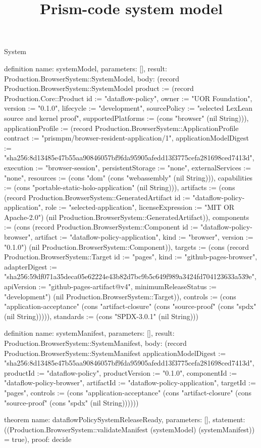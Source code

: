 \begin{lexlean}{System}
\title{Prism-code system model}
\begin{semanticmodule}
definition{
  name: systemModel,
  parameters: [],
  result: Production.BrowserSystem::SystemModel,
  body: (record Production.BrowserSystem::SystemModel {product := (record Production.Core::Product {id := "dataflow-policy", owner := "UOR Foundation", version := "0.1.0", lifecycle := "development", sourcePolicy := "selected LexLean source and kernel proof", supportedPlatforms := (cons "browser" (nil String))}), applicationProfile := (record Production.BrowserSystem::ApplicationProfile {contract := "prismpm/browser-resident-application/1", applicationModelDigest := "sha256:8d13485e47b55aa90846057bf9fda95905afedd13f3775cefa281698ced7413d", execution := "browser-session", persistentStorage := "none", externalServices := "none", resources := (cons "dom" (cons "webassembly" (nil String))), capabilities := (cons "portable-static-holo-application" (nil String))}), artifacts := (cons (record Production.BrowserSystem::GeneratedArtifact {id := "dataflow-policy-application", role := "selected-application", licenseExpression := "MIT OR Apache-2.0"}) (nil Production.BrowserSystem::GeneratedArtifact)), components := (cons (record Production.BrowserSystem::Component {id := "dataflow-policy-browser", artifact := "dataflow-policy-application", kind := "browser", version := "0.1.0"}) (nil Production.BrowserSystem::Component)), targets := (cons (record Production.BrowserSystem::Target {id := "pages", kind := "github-pages-browser", adapterDigest := "sha256:59df071a35deca05e62224e43b82d7bc9b5c649f989a3424fd704123633a539e", apiVersion := "github-pages-artifact@v4", minimumReleaseStatus := "development"}) (nil Production.BrowserSystem::Target)), controls := (cons "application-acceptance" (cons "artifact-closure" (cons "source-proof" (cons "spdx" (nil String))))), standards := (cons "SPDX-3.0.1" (nil String))})
}

definition{
  name: systemManifest,
  parameters: [],
  result: Production.BrowserSystem::SystemManifest,
  body: (record Production.BrowserSystem::SystemManifest {applicationModelDigest := "sha256:8d13485e47b55aa90846057bf9fda95905afedd13f3775cefa281698ced7413d", productId := "dataflow-policy", productVersion := "0.1.0", componentId := "dataflow-policy-browser", artifactId := "dataflow-policy-application", targetId := "pages", controls := (cons "application-acceptance" (cons "artifact-closure" (cons "source-proof" (cons "spdx" (nil String)))))})
}

theorem{
  name: dataflowPolicySystemReleaseReady,
  parameters: [],
  statement: ((Production.BrowserSystem::validateManifest (systemModel) (systemManifest)) = true),
  proof: decide{}
}
\end{semanticmodule}
\end{lexlean}

